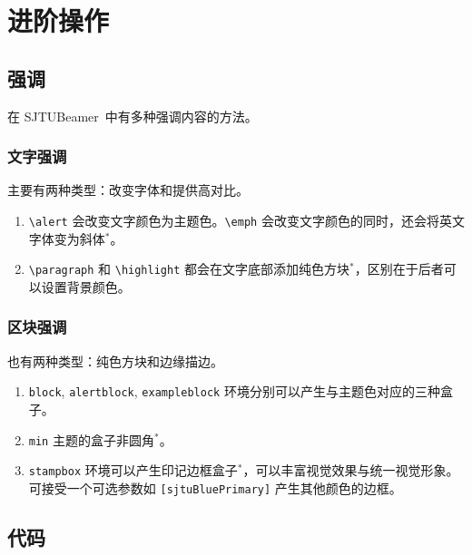 \documentclass[
    UTF8,
    heading=true,
    12pt,
    a4paper
]{ctexrep}
\def\themename{\textsf{SJTUBeamer}}
\begin{document}
    \part{进阶操作}

    \chapter{强调}
    
    在 \themename\ 中有多种强调内容的方法。

    \section{文字强调}

    主要有两种类型：改变字体和提供高对比。
    

    \begin{enumerate}\small
        \item \texttt{\textbackslash{}alert} 会改变文字颜色为主题色。\texttt{\textbackslash{}emph} 会改变文字颜色的同时，还会将英文字体变为斜体$^*$。
        \item \texttt{\textbackslash{}paragraph} 和 \texttt{\textbackslash{}highlight} 都会在文字底部添加纯色方块$^*$，区别在于后者可以设置背景颜色。
    \end{enumerate}

    \section{区块强调}

    也有两种类型：纯色方块和边缘描边。



    \begin{enumerate}\small
        \item \texttt{block}, \texttt{alertblock}, \texttt{exampleblock} 环境分别可以产生与主题色对应的三种盒子。
        \item \texttt{min} 主题的盒子非圆角$^*$。
        \item \texttt{stampbox} 环境可以产生印记边框盒子$^*$，可以丰富视觉效果与统一视觉形象。可接受一个可选参数如 \texttt{[sjtuBluePrimary]} 产生其他颜色的边框。
    \end{enumerate}

    \chapter{代码}
\end{document}
